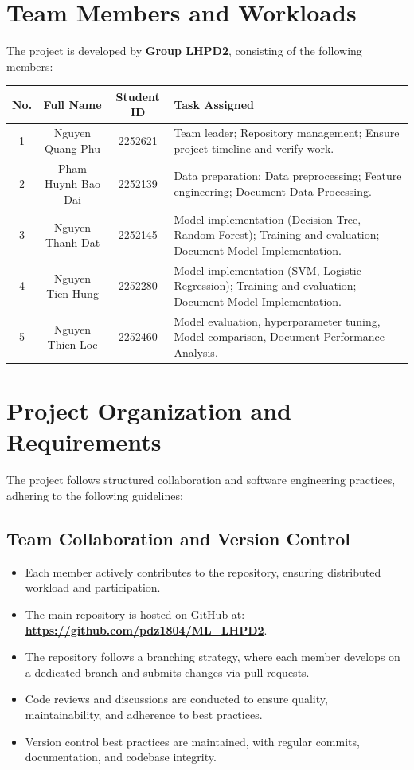 \section{Team Members and Workloads}

The project is developed by \textbf{Group LHPD2}, consisting of the following members:

\begin{center}
    \renewcommand{\arraystretch}{1.5}
    \begin{tabularx}{\textwidth}{||c|c|c|X||}
    \hline
    \textbf{No.} & \textbf{Full Name} & \textbf{Student ID} & \textbf{Task Assigned} \\
    \hline
    1 & Nguyen Quang Phu & 2252621 & Team leader; Repository management; Ensure project timeline and verify work. \\
    \hline
    2 & Pham Huynh Bao Dai & 2252139 & Data preparation; Data preprocessing; Feature engineering; Document Data Processing. \\
    \hline
    3 & Nguyen Thanh Dat & 2252145 & Model implementation (Decision Tree, Random Forest); Training and evaluation; Document Model Implementation. \\
    \hline
    4 & Nguyen Tien Hung & 2252280 & Model implementation (SVM, Logistic Regression); Training and evaluation; Document Model Implementation. \\
    \hline
    5 & Nguyen Thien Loc & 2252460 & Model evaluation, hyperparameter tuning, Model comparison, Document Performance Analysis. \\
    \hline
    \end{tabularx}
\end{center} 

\section{Project Organization and Requirements}

The project follows structured collaboration and software engineering practices, adhering to the following guidelines:

\subsection{Team Collaboration and Version Control}

\begin{itemize}
    \item Each member actively contributes to the repository, ensuring distributed workload and participation.
    \item The main repository is hosted on GitHub at:  
    \textbf{\url{https://github.com/pdz1804/ML_LHPD2}}.
    \item The repository follows a branching strategy, where each member develops on a dedicated branch and submits changes via pull requests.
    \item Code reviews and discussions are conducted to ensure quality, maintainability, and adherence to best practices.
    \item Version control best practices are maintained, with regular commits, documentation, and codebase integrity.
\end{itemize}

